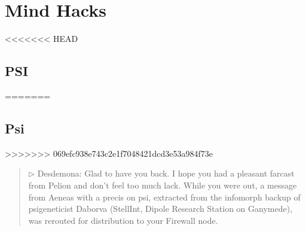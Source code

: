 \chapter{Mind Hacks} \label{cha:mind-hacks} 













<<<<<<< HEAD \section{PSI} ======= \section{Psi} >>>>>>> 069efc938e743c2e1f7048421dcd3e53a984f73e 

\begin{quotation} 

$\triangleright $ Desdemona: Glad to have you back. I hope you had a pleasant farcast from Pelion and don’t feel too much lack. While you were out, a message from Aeneas with a precis on psi, extracted from the infomorph backup of psigeneticist Daborva (StellInt, Dipole Research Station on Ganymede), was rerouted for distribution to your Firewall node. \end{quotation} 

